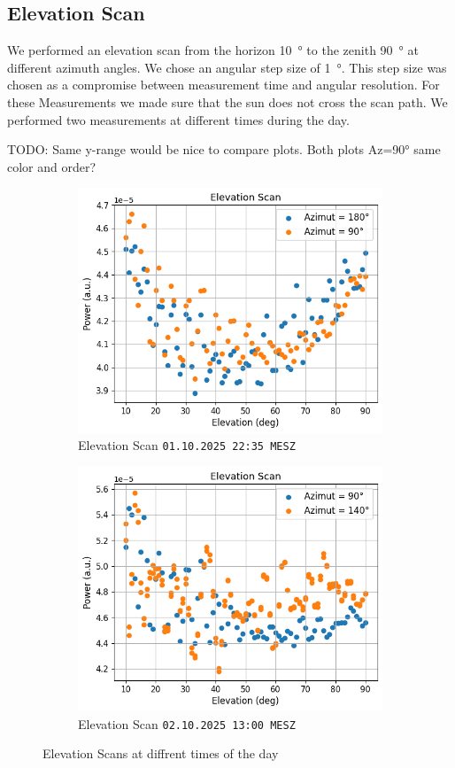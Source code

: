 \subsection{Elevation Scan}
We performed an elevation scan from the horizon \SI{10}{\degree} to the zenith \SI{90}{\degree} at different  azimuth angles. We chose an angular step size of \SI{1}{\degree}. This step size was chosen as a compromise between measurement time and angular resolution. For these Measurements we made sure that the sun does not cross the scan path. We performed two measurements at different times during the day.

TODO: Same y-range would be nice to compare plots. Both plots Az=90° same color and order?

\begin{figure}[h]
\centering
\begin{subfigure}[t]{0.49\textwidth}
    \centering
    \includegraphics[width=0.9\linewidth]{assets/elev_scan_night.png}
    \caption{Elevation Scan \texttt{01.10.2025 22:35 MESZ}}
\end{subfigure}
\begin{subfigure}[t]{0.49\textwidth}
    \centering
    \includegraphics[width=0.9\linewidth]{assets/elev_scan_day.png}
    \caption{Elevation Scan \texttt{02.10.2025 13:00 MESZ}}
\end{subfigure}
\caption{Elevation Scans at diffrent times of the day}
\label{fig:elev_scan}
\end{figure}

